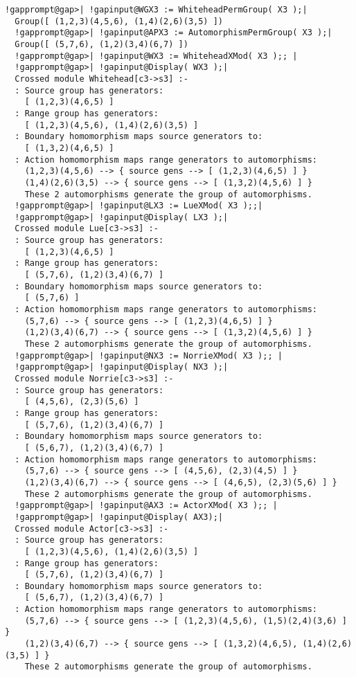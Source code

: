 \documentclass[a4paper,11pt]{report}
\begin{document}
{{\begin{Verbatim}[commandchars=!@|,fontsize=\small,frame=single,label=Example]
  !gapprompt@gap>| !gapinput@WGX3 := WhiteheadPermGroup( X3 );|
  Group([ (1,2,3)(4,5,6), (1,4)(2,6)(3,5) ])
  !gapprompt@gap>| !gapinput@APX3 := AutomorphismPermGroup( X3 );|
  Group([ (5,7,6), (1,2)(3,4)(6,7) ])
  !gapprompt@gap>| !gapinput@WX3 := WhiteheadXMod( X3 );; |
  !gapprompt@gap>| !gapinput@Display( WX3 );|
  Crossed module Whitehead[c3->s3] :- 
  : Source group has generators:
    [ (1,2,3)(4,6,5) ]
  : Range group has generators:
    [ (1,2,3)(4,5,6), (1,4)(2,6)(3,5) ]
  : Boundary homomorphism maps source generators to:
    [ (1,3,2)(4,6,5) ]
  : Action homomorphism maps range generators to automorphisms:
    (1,2,3)(4,5,6) --> { source gens --> [ (1,2,3)(4,6,5) ] }
    (1,4)(2,6)(3,5) --> { source gens --> [ (1,3,2)(4,5,6) ] }
    These 2 automorphisms generate the group of automorphisms.
  !gapprompt@gap>| !gapinput@LX3 := LueXMod( X3 );;|
  !gapprompt@gap>| !gapinput@Display( LX3 );|
  Crossed module Lue[c3->s3] :- 
  : Source group has generators:
    [ (1,2,3)(4,6,5) ]
  : Range group has generators:
    [ (5,7,6), (1,2)(3,4)(6,7) ]
  : Boundary homomorphism maps source generators to:
    [ (5,7,6) ]
  : Action homomorphism maps range generators to automorphisms:
    (5,7,6) --> { source gens --> [ (1,2,3)(4,6,5) ] }
    (1,2)(3,4)(6,7) --> { source gens --> [ (1,3,2)(4,5,6) ] }
    These 2 automorphisms generate the group of automorphisms.
  !gapprompt@gap>| !gapinput@NX3 := NorrieXMod( X3 );; |
  !gapprompt@gap>| !gapinput@Display( NX3 );|
  Crossed module Norrie[c3->s3] :- 
  : Source group has generators:
    [ (4,5,6), (2,3)(5,6) ]
  : Range group has generators:
    [ (5,7,6), (1,2)(3,4)(6,7) ]
  : Boundary homomorphism maps source generators to:
    [ (5,6,7), (1,2)(3,4)(6,7) ]
  : Action homomorphism maps range generators to automorphisms:
    (5,7,6) --> { source gens --> [ (4,5,6), (2,3)(4,5) ] }
    (1,2)(3,4)(6,7) --> { source gens --> [ (4,6,5), (2,3)(5,6) ] }
    These 2 automorphisms generate the group of automorphisms.
  !gapprompt@gap>| !gapinput@AX3 := ActorXMod( X3 );; |
  !gapprompt@gap>| !gapinput@Display( AX3);|
  Crossed module Actor[c3->s3] :- 
  : Source group has generators:
    [ (1,2,3)(4,5,6), (1,4)(2,6)(3,5) ]
  : Range group has generators:
    [ (5,7,6), (1,2)(3,4)(6,7) ]
  : Boundary homomorphism maps source generators to:
    [ (5,6,7), (1,2)(3,4)(6,7) ]
  : Action homomorphism maps range generators to automorphisms:
    (5,7,6) --> { source gens --> [ (1,2,3)(4,5,6), (1,5)(2,4)(3,6) ] }
    (1,2)(3,4)(6,7) --> { source gens --> [ (1,3,2)(4,6,5), (1,4)(2,6)(3,5) ] }
    These 2 automorphisms generate the group of automorphisms.
  

\end{Verbatim}}}
\end{document}
